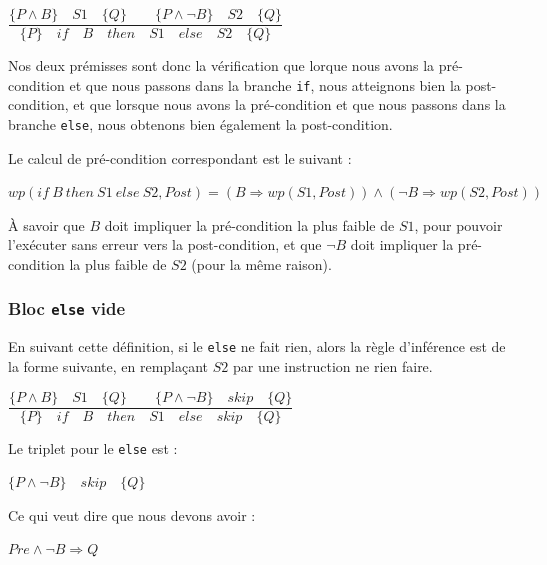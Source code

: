 \documentclass[12pt,francais,]{scrbook}
\begin{document}
\begin{center}
\(\dfrac{\{P \wedge B\}\quad S1\quad \{Q\} \quad \quad \{P \wedge \neg B\}\quad S2\quad \{Q\}}{\{P\}\quad if\quad B\quad then\quad S1\quad else\quad S2 \quad \{Q\}}\)
\end{center}

Nos deux prémisses sont donc la vérification que lorque nous avons la
pré-condition et que nous passons dans la branche \texttt{if}, nous
atteignons bien la post-condition, et que lorsque nous avons la
pré-condition et que nous passons dans la branche \texttt{else}, nous
obtenons bien également la post-condition.

Le calcul de pré-condition correspondant est le suivant :

\begin{center}
\(wp(if\ B\ then\ S1\ else\ S2 , Post) = (B \Rightarrow wp(S1, Post)) \wedge (\neg B \Rightarrow wp(S2, Post))\)
\end{center}

À savoir que \(B\) doit impliquer la pré-condition la plus faible de
\(S1\), pour pouvoir l'exécuter sans erreur vers la post-condition, et
que \(\neg B\) doit impliquer la pré-condition la plus faible de \(S2\)
(pour la même raison).

\subsubsection{\texorpdfstring{Bloc \texttt{else}
vide}{Bloc else vide}}\label{bloc-else-vide}

En suivant cette définition, si le \texttt{else} ne fait rien, alors la
règle d'inférence est de la forme suivante, en remplaçant \(S2\) par une
instruction \og{}ne rien faire\fg{}.

\begin{center}
\(\dfrac{\{P \wedge B\}\quad S1\quad \{Q\} \quad \quad \{P \wedge \neg B\}\quad skip\quad \{Q\}}{\{P\}\quad if\quad B\quad then\quad S1\quad else\quad skip \quad \{Q\}}\)
\end{center}

Le triplet pour le \texttt{else} est :

\begin{center} \(\{P \wedge \neg B\}\quad skip\quad \{Q\}\)
\end{center}

Ce qui veut dire que nous devons avoir :

\begin{center} \(Pre \wedge \neg B \Rightarrow Q\) \end{center}
\end{document}
